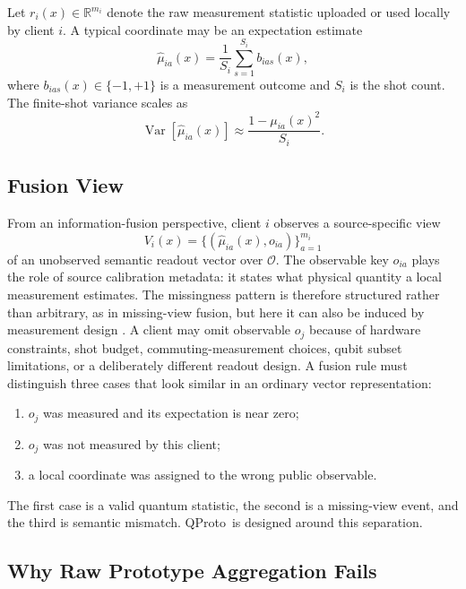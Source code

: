 \documentclass[preprint]{elsarticle}
\newcommand{\method}{QProto}
\newcommand{\R}{\mathbb{R}}
\newcommand{\cO}{\mathcal{O}}
\begin{document}
Let \(r_i(x)\in\R^{m_i}\) denote the raw measurement statistic uploaded or used locally by client \(i\). A typical coordinate may be an expectation estimate
\begin{equation}
    \hat{\mu}_{ia}(x)=\frac{1}{S_i}\sum_{s=1}^{S_i} b_{ias}(x),
\end{equation}
where \(b_{ias}(x)\in\{-1,+1\}\) is a measurement outcome and \(S_i\) is the shot count. The finite-shot variance scales as
\begin{equation}
    \operatorname{Var}[\hat{\mu}_{ia}(x)] \approx \frac{1-\mu_{ia}(x)^2}{S_i}.
\end{equation}

\subsection{Fusion View}

From an information-fusion perspective, client \(i\) observes a source-specific view
\begin{equation}
    V_i(x)=\{(\hat{\mu}_{ia}(x),o_{ia})\}_{a=1}^{m_i}
\end{equation}
of an unobserved semantic readout vector over \(\cO\). The observable key \(o_{ia}\) plays the role of source calibration metadata: it states what physical quantity a local measurement estimates. The missingness pattern is therefore structured rather than arbitrary, as in missing-view fusion, but here it can also be induced by measurement design \cite{havaei2016hemis,tang2024incomplete,huang2020classicalshadows}. A client may omit observable \(o_j\) because of hardware constraints, shot budget, commuting-measurement choices, qubit subset limitations, or a deliberately different readout design. A fusion rule must distinguish three cases that look similar in an ordinary vector representation:
\begin{enumerate}
    \item \(o_j\) was measured and its expectation is near zero;
    \item \(o_j\) was not measured by this client;
    \item a local coordinate was assigned to the wrong public observable.
\end{enumerate}
The first case is a valid quantum statistic, the second is a missing-view event, and the third is semantic mismatch. \method\ is designed around this separation.

\subsection{Why Raw Prototype Aggregation Fails}
\end{document}
